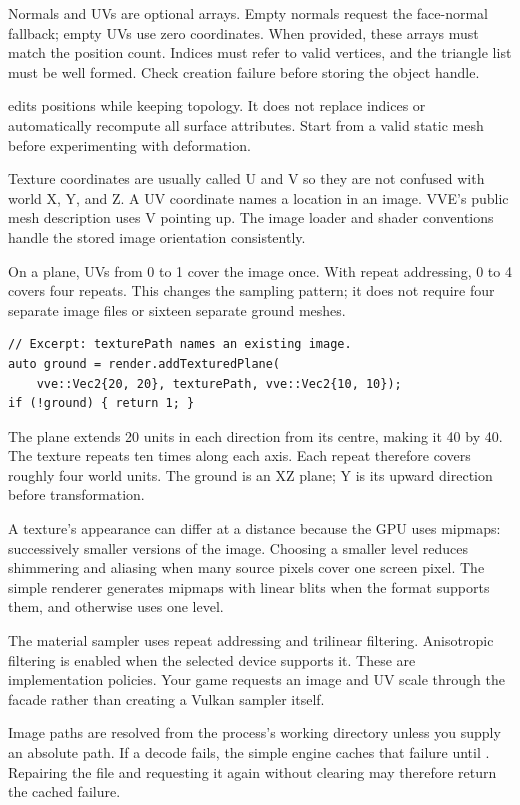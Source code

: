 \documentclass[11pt,a4paper]{article}
\begin{document}
Normals and UVs are optional arrays. Empty normals request the face-normal fallback; empty UVs use zero coordinates. When provided, these arrays must match the position count. Indices must refer to valid vertices, and the triangle list must be well formed. Check creation failure before storing the object handle.

 edits positions while keeping topology. It does not replace indices or automatically recompute all surface attributes. Start from a valid static mesh before experimenting with deformation.

Texture coordinates are usually called U and V so they are not confused with world X, Y, and Z. A UV coordinate names a location in an image. VVE's public mesh description uses V pointing up. The image loader and shader conventions handle the stored image orientation consistently.

On a plane, UVs from 0 to 1 cover the image once. With repeat addressing, 0 to 4 covers four repeats. This changes the sampling pattern; it does not require four separate image files or sixteen separate ground meshes.
\begin{lstlisting}
// Excerpt: texturePath names an existing image.
auto ground = render.addTexturedPlane(
    vve::Vec2{20, 20}, texturePath, vve::Vec2{10, 10});
if (!ground) { return 1; }
\end{lstlisting}
The plane extends 20 units in each direction from its centre, making it 40 by 40. The texture repeats ten times along each axis. Each repeat therefore covers roughly four world units. The ground is an XZ plane; Y is its upward direction before transformation.

A texture's appearance can differ at a distance because the GPU uses mipmaps: successively smaller versions of the image. Choosing a smaller level reduces shimmering and aliasing when many source pixels cover one screen pixel. The simple renderer generates mipmaps with linear blits when the format supports them, and otherwise uses one level.

The material sampler uses repeat addressing and trilinear filtering. Anisotropic filtering is enabled when the selected device supports it. These are implementation policies. Your game requests an image and UV scale through the facade rather than creating a Vulkan sampler itself.

Image paths are resolved from the process's working directory unless you supply an absolute path. If a decode fails, the simple engine caches that failure until . Repairing the file and requesting it again without clearing may therefore return the cached failure.
\end{document}
